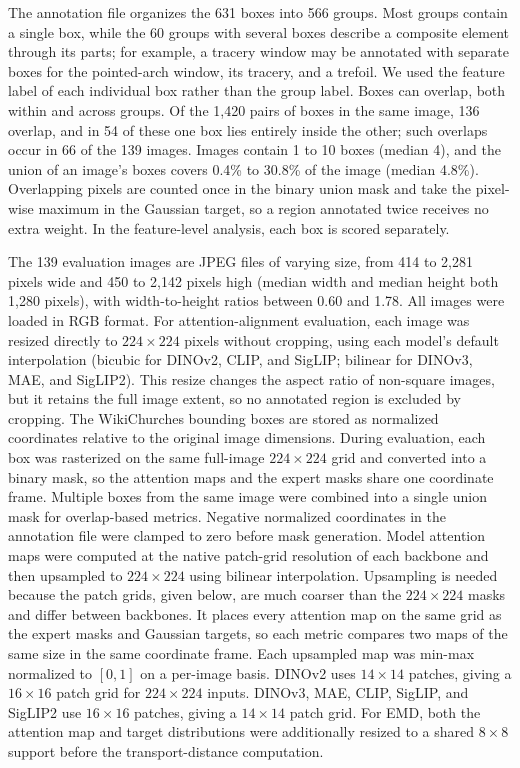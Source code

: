 \documentclass[lineno,pdflatex,sn-mathphys-num]{sn-jnl}%
\theoremstyle{thmstyleone}%
\theoremstyle{thmstyletwo}%
\theoremstyle{thmstylethree}%
\begin{document}
The annotation file organizes the 631 boxes into 566 groups. Most groups contain a single box, while the 60 groups with several boxes describe a composite element through its parts; for example, a tracery window may be annotated with separate boxes for the pointed-arch window, its tracery, and a trefoil. We used the feature label of each individual box rather than the group label. Boxes can overlap, both within and across groups. Of the 1,420 pairs of boxes in the same image, 136 overlap, and in 54 of these one box lies entirely inside the other; such overlaps occur in 66 of the 139 images. Images contain 1 to 10 boxes (median 4), and the union of an image's boxes covers 0.4\% to 30.8\% of the image (median 4.8\%). Overlapping pixels are counted once in the binary union mask and take the pixel-wise maximum in the Gaussian target, so a region annotated twice receives no extra weight. In the feature-level analysis, each box is scored separately.

The 139 evaluation images are JPEG files of varying size, from 414 to 2,281 pixels wide and 450 to 2,142 pixels high (median width and median height both 1,280 pixels), with width-to-height ratios between 0.60 and 1.78. All images were loaded in RGB format. For attention-alignment evaluation, each image was resized directly to $224 \times 224$ pixels without cropping, using each model's default interpolation (bicubic for DINOv2, CLIP, and SigLIP; bilinear for DINOv3, MAE, and SigLIP2). This resize changes the aspect ratio of non-square images, but it retains the full image extent, so no annotated region is excluded by cropping. The WikiChurches bounding boxes are stored as normalized coordinates relative to the original image dimensions. During evaluation, each box was rasterized on the same full-image $224 \times 224$ grid and converted into a binary mask, so the attention maps and the expert masks share one coordinate frame. Multiple boxes from the same image were combined into a single union mask for overlap-based metrics. Negative normalized coordinates in the annotation file were clamped to zero before mask generation. Model attention maps were computed at the native patch-grid resolution of each backbone and then upsampled to $224 \times 224$ using bilinear interpolation. Upsampling is needed because the patch grids, given below, are much coarser than the $224 \times 224$ masks and differ between backbones. It places every attention map on the same grid as the expert masks and Gaussian targets, so each metric compares two maps of the same size in the same coordinate frame. Each upsampled map was min-max normalized to $[0,1]$ on a per-image basis. DINOv2 uses $14 \times 14$ patches, giving a $16 \times 16$ patch grid for $224 \times 224$ inputs. DINOv3, MAE, CLIP, SigLIP, and SigLIP2 use $16 \times 16$ patches, giving a $14 \times 14$ patch grid. For EMD, both the attention map and target distributions were additionally resized to a shared $8 \times 8$ support before the transport-distance computation.
\end{document}
